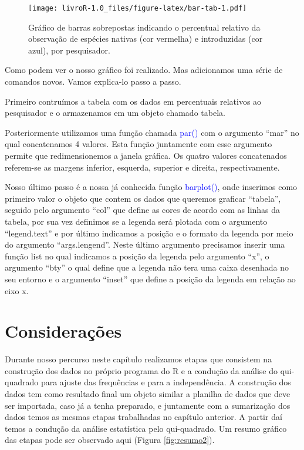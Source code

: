 \documentclass[titlepage, oneside, openany, a4paper]{book}
\begin{document}
\begin{figure}
\centering
\texttt{[image: livroR-1.0\_files/figure-latex/bar-tab-1.pdf]}
\caption{\label{fig:bar-tab}Gráfico de barras sobrepostas indicando o percentual relativo da observação de espécies nativas (cor vermelha) e introduzidas (cor azul), por pesquisador.}
\end{figure}

Como podem ver o nosso gráfico foi realizado. Mas adicionamos uma série de comandos novos. Vamos explica-lo passo a passo.

Primeiro contruímos a tabela com os dados em percentuais relativos ao pesquisador e o armazenamos em um objeto chamado tabela.

Posteriormente utilizamos uma função chamada \textcolor{blue}{par()} com o argumento ``mar'' no qual concatenamos 4 valores. Esta função juntamente com esse argumento permite que redimensionemos a janela gráfica. Os quatro valores concatenados referem-se as margens inferior, esquerda, superior e direita, respectivamente.

Nosso último passo é a nossa já conhecida função \textcolor{blue}{barplot()}, onde inserimos como primeiro valor o objeto que contem os dados que queremos graficar ``tabela'', seguido pelo argumento ``col'' que define as cores de acordo com as linhas da tabela, por sua vez definimos se a legenda será plotada com o argumento ``legend.text'' e por último indicamos a posição e o formato da legenda por meio do argumento ``args.lengend''. Neste último argumento precisamos inserir uma função list no qual indicamos a posição da legenda pelo argumento ``x'', o argumento ``bty'' o qual define que a legenda não tera uma caixa desenhada no seu entorno e o argumento ``inset'' que define a posição da legenda em relação ao eixo x.

\hypertarget{considerauxe7uxf5es-1}{%
\section{Considerações}\label{considerauxe7uxf5es-1}}

Durante nosso percurso neste capítulo realizamos etapas que consistem na construção dos dados no próprio programa do R e a condução da análise do qui-quadrado para ajuste das frequências e para a independência. A construção dos dados tem como resultado final um objeto similar a planilha de dados que deve ser importada, caso já a tenha preparado, e juntamente com a sumarização dos dados temos as mesmas etapas trabalhadas no capítulo anterior. A partir daí temos a condução da análise estatística pelo qui-quadrado. Um resumo gráfico das etapas pode ser observado aqui (Figura \ref{fig:resumo2}).
\end{document}
